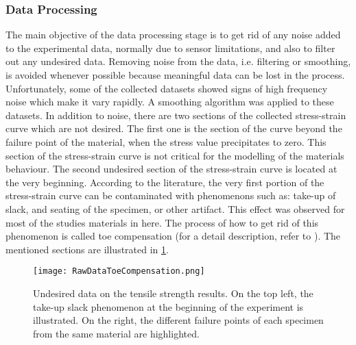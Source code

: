 \subsubsection{Data Processing}

The main objective of the data processing stage is to get rid of any noise added to the experimental data, normally due to sensor limitations, and also to filter out any undesired data. Removing noise from the data, i.e. filtering or smoothing, is avoided whenever possible because meaningful data can be lost in the process. Unfortunately, some of the collected datasets showed signs of high frequency noise which make it vary rapidly. A smoothing algorithm was applied to these datasets. In addition to noise, there are two sections of the collected stress-strain curve which are not desired. The first one is the section of the curve beyond the failure point of the material, when the stress value precipitates to zero. This section of the stress-strain curve is not critical for the modelling of the materials behaviour. The second undesired section of the stress-strain curve is located at the very beginning. According to the literature, the very first portion of the stress-strain curve can be contaminated with phenomenons such as: take-up of slack, and seating of the specimen, or other artifact. This effect was observed for most of the studies materials in here. The process of how to get rid of this phenomenon is called toe compensation (for a detail description, refer to \cite{astmd638}). The mentioned sections are illustrated in \cref{fig:rawData}.

\begin{figure}[htb!]
    \centering
    \texttt{[image: RawDataToeCompensation.png]}
    \caption{Undesired data on the tensile strength results. On the top left, the take-up slack phenomenon at the beginning of the experiment is illustrated. On the right, the different failure points of each specimen from the same material are highlighted.}
    \label{fig:rawData}
\end{figure}

